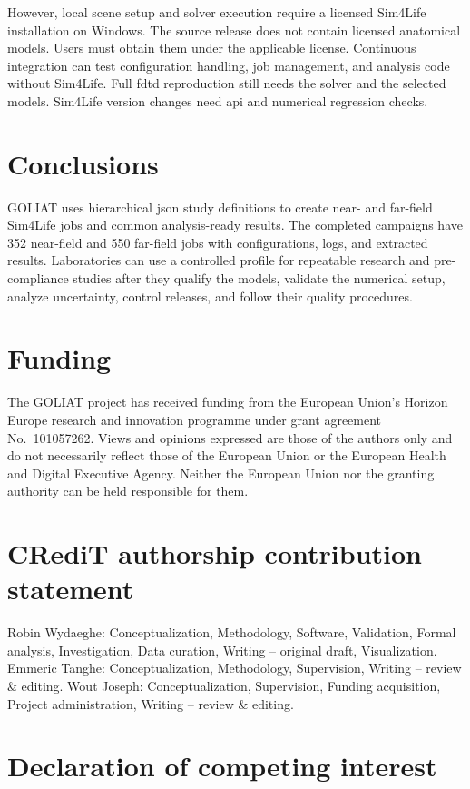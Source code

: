 \documentclass[final,5p,times,twocolumn]{elsarticle}
\begin{document}
However, local scene setup and solver execution require a licensed Sim4Life installation on Windows. The source release does not contain licensed anatomical models. Users must obtain them under the applicable license. Continuous integration can test configuration handling, job management, and analysis code without Sim4Life. Full \gls{fdtd} reproduction still needs the solver and the selected models. Sim4Life version changes need \gls{api} and numerical regression checks.

\section{Conclusions}

GOLIAT uses hierarchical \gls{json} study definitions to create near- and far-field Sim4Life jobs and common analysis-ready results. The completed campaigns have 352 near-field and 550 far-field jobs with configurations, logs, and extracted results. Laboratories can use a controlled profile for repeatable research and pre-compliance studies after they qualify the models, validate the numerical setup, analyze uncertainty, control releases, and follow their quality procedures.

\section*{Funding}

The GOLIAT project has received funding from the European Union's Horizon Europe research and innovation programme under grant agreement No.~101057262. Views and opinions expressed are those of the authors only and do not necessarily reflect those of the European Union or the European Health and Digital Executive Agency. Neither the European Union nor the granting authority can be held responsible for them.

\section*{CRediT authorship contribution statement}

Robin Wydaeghe: Conceptualization, Methodology, Software, Validation, Formal analysis, Investigation, Data curation, Writing -- original draft, Visualization. Emmeric Tanghe: Conceptualization, Methodology, Supervision, Writing -- review \& editing. Wout Joseph: Conceptualization, Supervision, Funding acquisition, Project administration, Writing -- review \& editing.

\section*{Declaration of competing interest}
\end{document}
